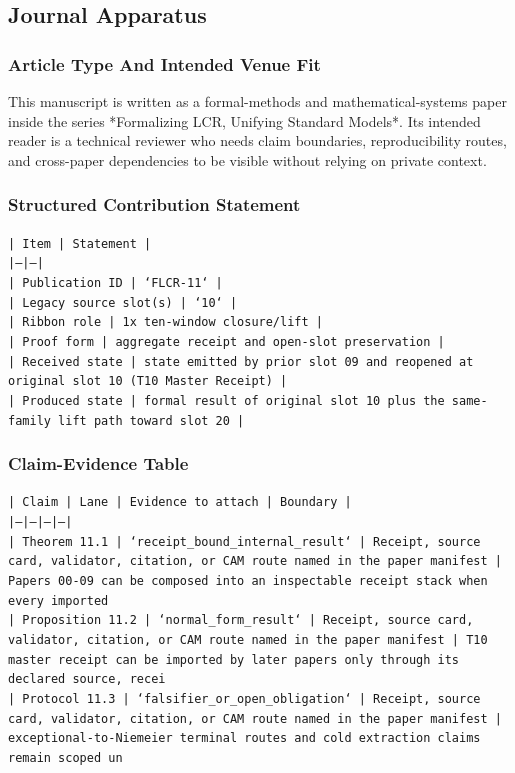 \documentclass[11pt]{article}
\begin{document}
\subsection*{Journal Apparatus}

\subsubsection*{Article Type And Intended Venue Fit}

This manuscript is written as a formal-methods and mathematical-systems paper
inside the series *Formalizing LCR, Unifying Standard Models*. Its intended
reader is a technical reviewer who needs claim boundaries, reproducibility
routes, and cross-paper dependencies to be visible without relying on private
context.

\subsubsection*{Structured Contribution Statement}

\noindent\texttt{| Item | Statement |}\\
\noindent\texttt{|---|---|}\\
\noindent\texttt{| Publication ID | `FLCR-11` |}\\
\noindent\texttt{| Legacy source slot(s) | `10` |}\\
\noindent\texttt{| Ribbon role | 1x ten-window closure/lift |}\\
\noindent\texttt{| Proof form | aggregate receipt and open-slot preservation |}\\
\noindent\texttt{| Received state | state emitted by prior slot 09 and reopened at original slot 10 (T10 Master Receipt) |}\\
\noindent\texttt{| Produced state | formal result of original slot 10 plus the same-family lift path toward slot 20 |}\\

\subsubsection*{Claim-Evidence Table}

\noindent\texttt{| Claim | Lane | Evidence to attach | Boundary |}\\
\noindent\texttt{|---|---|---|---|}\\
\noindent\texttt{| Theorem 11.1 | `receipt\_bound\_internal\_result` | Receipt, source card, validator, citation, or CAM route named in the paper manifest | Papers 00-09 can be composed into an inspectable receipt stack when every imported }\\
\noindent\texttt{| Proposition 11.2 | `normal\_form\_result` | Receipt, source card, validator, citation, or CAM route named in the paper manifest | T10 master receipt can be imported by later papers only through its declared source, recei}\\
\noindent\texttt{| Protocol 11.3 | `falsifier\_or\_open\_obligation` | Receipt, source card, validator, citation, or CAM route named in the paper manifest | exceptional-to-Niemeier terminal routes and cold extraction claims remain scoped un}\\
\end{document}
